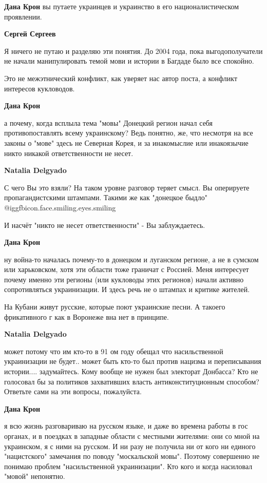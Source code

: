 \begin{itemize}
\begin{itemize}
\textbf{Дана Крон} вы путаете украинцев и украинство в его националистическом проявлении.

\textbf{Сергей Сергеев} 

Я ничего не путаю и разделяю эти понятия. До 2004 года, пока выгодополучатели не
начали манипулировать темой мови и истории в Багдаде было все спокойно.

Это не межэтнический конфликт, как уверяет нас автор поста, а конфликт интересов кукловодов.

\textbf{Дана Крон} 

а почему, когда всплыла тема "мовы" Донецкий регион начал себя
противопоставлять всему украинскому? Ведь понятно, же, что несмотря на все
законы о "мове" здесь не Северная Корея, и за инакомыслие или инакоязычие никто
никакой ответственности не несет.

\textbf{Natalia Delgyado} 

С чего Вы это взяли? На таком уровне разговор теряет смысл. Вы оперируете
пропагандистскими штампами. Такими же как "донецкое быдло"  @igg{fbicon.face.smiling.eyes.smiling} 

И насчёт "никто не несет ответственности" - Вы заблуждаетесь.

\textbf{Дана Крон} 

ну война-то началась почему-то в донецком и луганском регионе, а не в сумском
или харьковском, хотя эти области тоже граничат с Россией. Меня интересует
почему именно эти регионы (или кукловоды этих регионов) начали активно
сопротивляться украинизации. И здесь речь не о штампах и критике жителей.


На Кубани живут русские, которые поют украинские песни. А такоего фрикативного г как в Воронеже вна нет в принципе.

\textbf{Natalia Delgyado} 

может потому что им кто-то в 91 ом году обещал что насильственной украинизации
не будет.. может быть кто-то был против нацизма и переписывания
истории.... задумайтесь. Кому вообще не нужен был электорат Донбасса? Кто не
голосовал бы за политиков захвативших власть антиконституционным
способом? Ответьте сами на эти вопросы, пожалуйста.

\textbf{Дана Крон} 

я всю жизнь разговариваю на русском языке, и даже во времена работы в гос
органах, и в поездках в западные области с местными жителями: они со мной на
украинском, я с ними на русском. И ни разу не получила ни от кого ни единого
"нацистского" замечания по поводу "москальской мовы". Поэтому совершенно не
понимаю проблем "насильственной украинизации". Кто кого и когда насиловал
"мовой" непонятно.


\end{itemize}
\end{itemize}
